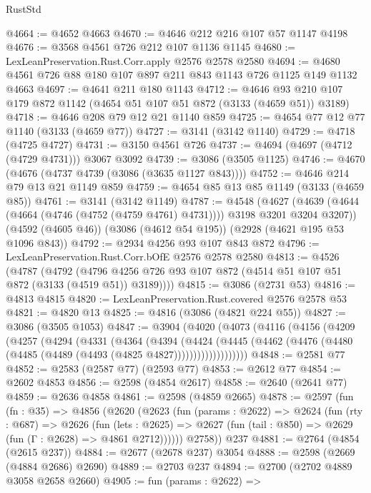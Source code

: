\begin{lexlean}{RustStd}
\begin{coremodule}
@4664 := @4652 @4663
@4670 := @4646 @212 @216 @107 @57 @1147 @4198
@4676 := @3568 @4561 @726 @212 @107 @1136 @1145
@4680 := LexLeanPreservation.Rust.Corr.apply @2576 @2578 @2580
@4694 := @4680 @4561 @726 @88 @180 @107 @897 @211 @843 @1143 @726 @1125 @149 @1132 @4663
@4697 := @4641 @211 @180 @1143
@4712 := @4646 @93 @210 @107 @179 @872 @1142 (@4654 @51 @107 @51 @872 (@3133 (@4659 @51)) @3189)
@4718 := @4646 @208 @79 @12 @21 @1140 @859
@4725 := @4654 @77 @12 @77 @1140 (@3133 (@4659 @77))
@4727 := @3141 (@3142 @1140)
@4729 := @4718 (@4725 @4727)
@4731 := @3150 @4561 @726
@4737 := @4694 (@4697 (@4712 (@4729 @4731))) @3067 @3092
@4739 := @3086 (@3505 @1125)
@4746 := @4670 (@4676 (@4737 @4739 (@3086 (@3635 @1127 @843))))
@4752 := @4646 @214 @79 @13 @21 @1149 @859
@4759 := @4654 @85 @13 @85 @1149 (@3133 (@4659 @85))
@4761 := @3141 (@3142 @1149)
@4787 := @4548
    (@4627 (@4639 (@4644 (@4664 (@4746 (@4752 (@4759 @4761) @4731)))) @3198 @3201 @3204 @3207))
    (@4592 (@4605 @46))
    (@3086 (@4612 @54 @195))
    (@2928 (@4621 @195 @53 @1096 @843))
@4792 := @2934 @4256 @93 @107 @843 @872
@4796 := LexLeanPreservation.Rust.Corr.bOfE @2576 @2578 @2580
@4813 := @4526
    (@4787
      (@4792 (@4796 @4256 @726 @93 @107 @872 (@4514 @51 @107 @51 @872 (@3133 (@4519 @51)) @3189))))
@4815 := @3086 (@2731 @53)
@4816 := @4813 @4815
@4820 := LexLeanPreservation.Rust.covered @2576 @2578 @53
@4821 := @4820 @13
@4825 := @4816 (@3086 (@4821 @224 @55))
@4827 := @3086 (@3505 @1053)
@4847 := @3904
    (@4020
      (@4073
        (@4116
          (@4156
            (@4209
              (@4257
                (@4294
                  (@4331
                    (@4364
                      (@4394
                        (@4424
                          (@4445
                            (@4462
                              (@4476 (@4480 (@4485 (@4489 (@4493 (@4825 @4827)))))))))))))))))))
@4848 := @2581 @77
@4852 := @2583 (@2587 @77) (@2593 @77)
@4853 := @2612 @77
@4854 := @2602 @4853
@4856 := @2598 (@4854 @2617)
@4858 := @2640 (@2641 @77)
@4859 := @2636 @4858
@4861 := @2598 (@4859 @2665)
@4878 := @2597
    (fun (fn : @35) =>
    @4856
      (@2620
        (@2623
          (fun (params : @2622) =>
          @2624
            (fun (rty : @687) =>
            @2626
              (fun (lets : @2625) =>
              @2627 (fun (tail : @850) => @2629 (fun (Γ : @2628) => @4861 @2712))))))
        @2758))
    @237
@4881 := @2764 (@4854 (@2615 @237))
@4884 := @2677 (@2678 @237) @3054
@4888 := @2598 (@2669 (@4884 @2686) @2690)
@4889 := @2703 @237
@4894 := @2700 (@2702 @4889 @3058 @2658 @2660)
@4905 := fun (params : @2622) =>

\end{coremodule}
\end{lexlean}
